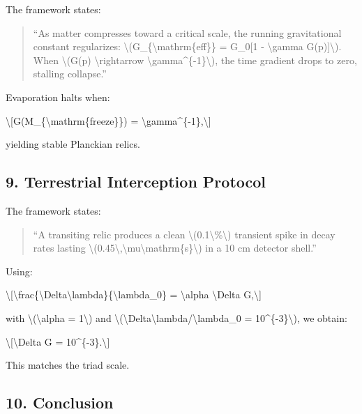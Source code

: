 \documentclass[
  10pt,
]{article}
\begin{document}
The framework states:

\begin{quote}
``As matter compresses toward a critical scale, the running
gravitational constant regularizes:
\textbackslash(G\_\{\textbackslash mathrm\{eff\}\} = G\_0{[}1 -
\textbackslash gamma G(p){]}\textbackslash). When \textbackslash(G(p)
\textbackslash rightarrow \textbackslash gamma\^{}\{-1\}\textbackslash),
the time gradient drops to zero, stalling collapse.''
\end{quote}

Evaporation halts when:

\textbackslash{[}G(M\_\{\textbackslash mathrm\{freeze\}\}) =
\textbackslash gamma\^{}\{-1\},\textbackslash{]}

yielding stable Planckian relics.

\hypertarget{terrestrial-interception-protocol}{%
\subsection{9. Terrestrial Interception
Protocol}\label{terrestrial-interception-protocol}}

The framework states:

\begin{quote}
``A transiting relic produces a clean
\textbackslash(0.1\textbackslash\%\textbackslash) transient spike in
decay rates lasting
\textbackslash(0.45\textbackslash,\textbackslash mu\textbackslash mathrm\{s\}\textbackslash)
in a 10 cm detector shell.''
\end{quote}

Using:

\textbackslash{[}\textbackslash frac\{\textbackslash Delta\textbackslash lambda\}\{\textbackslash lambda\_0\}
= \textbackslash alpha \textbackslash Delta G,\textbackslash{]}

with \textbackslash(\textbackslash alpha = 1\textbackslash) and
\textbackslash(\textbackslash Delta\textbackslash lambda/\textbackslash lambda\_0
= 10\^{}\{-3\}\textbackslash), we obtain:

\textbackslash{[}\textbackslash Delta G = 10\^{}\{-3\}.\textbackslash{]}

This matches the triad scale.

\hypertarget{conclusion}{%
\subsection{10. Conclusion}\label{conclusion}}
\end{document}
